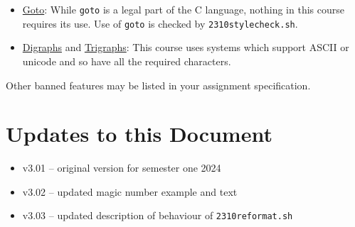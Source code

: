 \documentclass{article}
\begin{document}
\begin{itemize}
\item \underline{Goto}: While \texttt{goto} is a legal part of the C language, nothing in this course requires its use. Use of \texttt{goto} is checked by \texttt{2310stylecheck.sh}.
\item \underline{Digraphs} and \underline{Trigraphs}: This course uses systems which support ASCII or unicode and so have all the required characters.
\end{itemize}

\noindent Other banned features may be listed in your assignment specification.

\section{Updates to this Document}
\begin{itemize}
\item v3.01 -- original version for semester one 2024
\item v3.02 -- updated magic number example and text
\item v3.03 -- updated description of behaviour of \texttt{2310reformat.sh}
\end{itemize}
\end{document}
